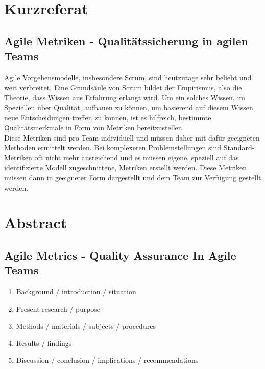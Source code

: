 \newpage
\chapter*{Kurzreferat}
\section*{Agile Metriken {-} Qualitätssicherung in agilen Teams}

Agile Vorgehensmodelle, insbesondere Scrum, sind heutzutage sehr beliebt und weit verbreitet.
Eine Grundsäule von Scrum bildet der Empirismus, also die Theorie, dass Wissen aus Erfahrung erlangt wird.
Um ein solches Wissen, im Speziellen über Qualität, aufbauen zu können, um basierend auf diesem Wissen neue Entscheidungen treffen zu können, ist es hilfreich, bestimmte Qualitätsmerkmale in Form von Metriken bereitzustellen.
\\
Diese Metriken sind pro Team individuell und müssen daher mit dafür geeigneten Methoden ermittelt werden.
Bei komplexeren Problemstellungen sind Standard-Metriken oft nicht mehr ausreichend und es müssen eigene, speziell auf das identifizierte Modell zugeschnittene, Metriken erstellt werden.
Diese Metriken müssen dann in geeigneter Form dargestellt und dem Team zur Verfügung gestellt werden.
\\


\newpage
\chapter*{Abstract}
\section*{Agile Metrics {-} Quality Assurance In Agile Teams}

\begin{enumerate}
    \item Background / introduction / situation
    \item Present research / purpose
    \item Methods / materials / subjects / procedures
    \item Results / findings
    \item Discussion / conclusion / implications / recommendations
\end{enumerate}

